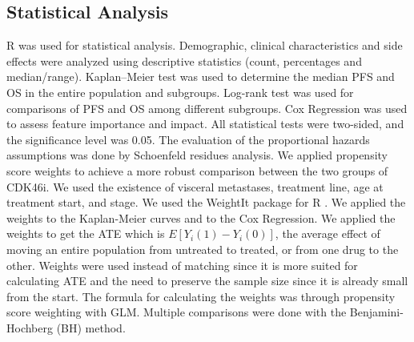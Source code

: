 \subsection{Statistical Analysis}
R was used for statistical analysis. Demographic, clinical characteristics and side effects were analyzed using descriptive statistics (count, percentages and median/range). Kaplan–Meier test was used to determine the median PFS and OS in the entire population and subgroups. Log-rank test was used for comparisons of PFS and OS among different subgroups. Cox Regression was used to assess feature importance and impact. All statistical tests were two-sided, and the significance level was 0.05. The evaluation of the proportional hazards assumptions was done by Schoenfeld residues analysis.
We applied propensity score weights to achieve a more robust comparison between the two groups of CDK4\/6i. We used the existence of visceral metastases, treatment line, age at treatment start, and stage. We used the WeightIt package for R \cite{WeightIt}. We applied the weights to the Kaplan-Meier curves and to the Cox Regression. We applied the weights to get the ATE which is $E[Y_i(1)-Y_i(0)]$, the average effect of moving an entire population from untreated to treated, or from one drug to the other. Weights were used instead of matching since it is more suited for calculating ATE and the need to preserve the sample size since it is already small from the start. The formula for calculating the weights was through propensity score weighting with GLM. Multiple comparisons were done with the Benjamini-Hochberg (BH) method. 





